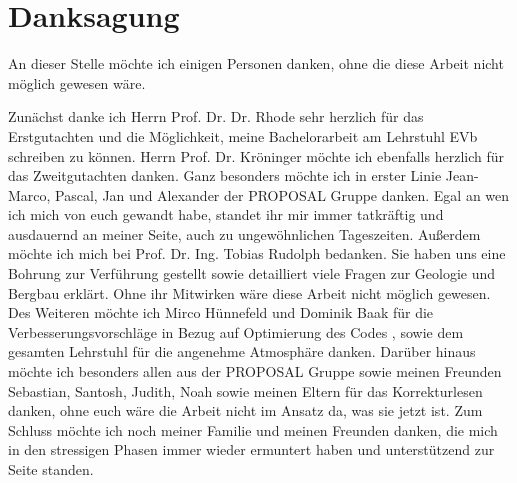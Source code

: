 \chapter*{Danksagung}
An dieser Stelle möchte ich einigen Personen danken, ohne die diese Arbeit nicht
möglich gewesen wäre.

Zunächst danke ich Herrn Prof. Dr. Dr. Rhode sehr herzlich
für das Erstgutachten und die Möglichkeit, meine Bachelorarbeit am Lehrstuhl EVb
schreiben zu können. Herrn Prof. Dr. Kröninger möchte ich ebenfalls herzlich für das
Zweitgutachten danken. 
Ganz besonders möchte ich in erster Linie 
Jean-Marco, Pascal, Jan und Alexander der PROPOSAL Gruppe danken.
Egal an wen ich mich von euch gewandt habe, standet ihr mir immer
tatkräftig und ausdauernd an meiner Seite, auch zu ungewöhnlichen Tageszeiten.
Außerdem möchte ich mich bei Prof. Dr. Ing. Tobias Rudolph bedanken.
Sie haben uns eine Bohrung zur Verführung gestellt sowie detailliert
viele Fragen zur Geologie und Bergbau erklärt. Ohne ihr Mitwirken wäre 
diese Arbeit nicht möglich gewesen.
Des Weiteren möchte ich Mirco Hünnefeld und Dominik Baak 
für die Verbesserungsvorschläge in Bezug auf Optimierung des Codes
, sowie dem gesamten Lehrstuhl für die angenehme Atmosphäre danken.
Darüber hinaus möchte ich besonders allen aus der PROPOSAL 
Gruppe sowie meinen Freunden Sebastian, Santosh, Judith, Noah
sowie meinen Eltern für das Korrekturlesen danken,
ohne euch wäre die Arbeit nicht im Ansatz da, was sie jetzt ist.
Zum Schluss möchte ich noch meiner Familie und meinen Freunden danken, die mich in den stressigen Phasen immer wieder ermuntert haben und unterstützend
zur Seite standen.

